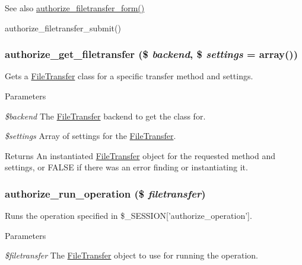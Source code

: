\begin{DoxySeeAlso}{See also}
\hyperlink{group__forms_gac54653dcbe434c2a6519e228874bba30}{authorize\_\-filetransfer\_\-form()} 

authorize\_\-filetransfer\_\-submit() 
\end{DoxySeeAlso}
\hypertarget{authorize_8inc_ae58f98088f7095a210ee0421586a9f7f}{
\subsubsection[{authorize\_\-get\_\-filetransfer}]{\setlength{\rightskip}{0pt plus 5cm}authorize\_\-get\_\-filetransfer (\$ {\em backend}, \/  \$ {\em settings} = {\ttfamily array()})}}
\label{authorize_8inc_ae58f98088f7095a210ee0421586a9f7f}
Gets a \hyperlink{classFileTransfer}{FileTransfer} class for a specific transfer method and settings.


\begin{DoxyParams}{Parameters}
\item[{\em \$backend}]The \hyperlink{classFileTransfer}{FileTransfer} backend to get the class for. \item[{\em \$settings}]Array of settings for the \hyperlink{classFileTransfer}{FileTransfer}.\end{DoxyParams}
\begin{DoxyReturn}{Returns}
An instantiated \hyperlink{classFileTransfer}{FileTransfer} object for the requested method and settings, or FALSE if there was an error finding or instantiating it. 
\end{DoxyReturn}
\hypertarget{authorize_8inc_aba5420b65b60431a0f845b7e09934ecd}{
\subsubsection[{authorize\_\-run\_\-operation}]{\setlength{\rightskip}{0pt plus 5cm}authorize\_\-run\_\-operation (\$ {\em filetransfer})}}
\label{authorize_8inc_aba5420b65b60431a0f845b7e09934ecd}
Runs the operation specified in \$\_\-SESSION\mbox{[}'authorize\_\-operation'\mbox{]}.


\begin{DoxyParams}{Parameters}
\item[{\em \$filetransfer}]The \hyperlink{classFileTransfer}{FileTransfer} object to use for running the operation. \end{DoxyParams}
